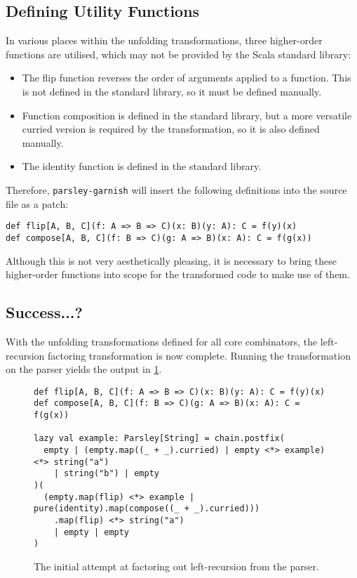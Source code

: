 \documentclass[../../main.tex]{subfiles}
\begin{document}
\subsection{Defining Utility Functions}\label{sec:leftrec-utils}
In various places within the unfolding transformations, three higher-order functions are utilised, which may not be provided by the Scala standard library:
\begin{itemize}
  \item The flip function reverses the order of arguments applied to a function. This is not defined in the standard library, so it must be defined manually.
  \item Function composition is defined in the standard library, but a more versatile curried version is required by the transformation, so it is also defined manually.
  \item The identity function  is defined in the standard library.
\end{itemize}
%
Therefore, \texttt{parsley-garnish} will insert the following definitions into the source file as a patch:
\begin{verbatim}
def flip[A, B, C](f: A => B => C)(x: B)(y: A): C = f(y)(x)
def compose[A, B, C](f: B => C)(g: A => B)(x: A): C = f(g(x))
\end{verbatim}
%
Although this is not very aesthetically pleasing, it is necessary to bring these higher-order functions into scope for the transformed code to make use of them.

\subsection*{Success...?}
With the unfolding transformations defined for all core combinators, the left-recursion factoring transformation is now complete.
Running the transformation on the  parser yields the output in \cref{fig:leftrec-example-bad}.
%
\begin{figure}[htbp]
\begin{verbatim}
def flip[A, B, C](f: A => B => C)(x: B)(y: A): C = f(y)(x)
def compose[A, B, C](f: B => C)(g: A => B)(x: A): C = f(g(x))

lazy val example: Parsley[String] = chain.postfix(
  empty | (empty.map((_ + _).curried) | empty <*> example) <*> string("a")
    | string("b") | empty
)(
  (empty.map(flip) <*> example | pure(identity).map(compose((_ + _).curried)))
    .map(flip) <*> string("a")
    | empty | empty
)
\end{verbatim}
\caption{The initial attempt at factoring out left-recursion from the  parser.}
\label{fig:leftrec-example-bad}
\end{figure}
\end{document}
